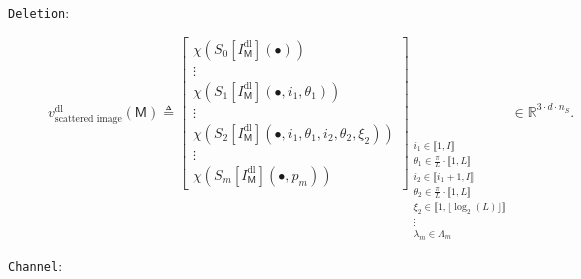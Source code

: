             \begin{description}
                \item[\texttt{Deletion}:]
                        \begin{equation}
                            \label{eq::deletion_scanetg_image_based_features}
                            v^{\text{dl}}_{\text{scattered image}}\left(\mathsf{M}\right) \triangleq \begin{bmatrix}
                                \chi \left(S_0[I^{\text{dl}}_{\mathsf{M}}]\left(\bullet\right)\right)\\
                                \vdots\\
                                \chi \left(S_1[I^{\text{dl}}_{\mathsf{M}}]\left(\bullet, i_1, \theta_1\right)\right)\\
                                \vdots\\
                                \chi \left(S_2[I^{\text{dl}}_{\mathsf{M}}]\left(\bullet, i_1, \theta_1, i_2, \theta_2, \xi_2\right)\right)\\
                                \vdots\\
                                \chi \left(S_m[I^{\text{dl}}_{\mathsf{M}}]\left(\bullet, p_m\right)\right)
                            \end{bmatrix}_{
                                \substack{
                                    i_1 \in \llbracket 1, I \rrbracket\\
                                    \theta_1 \in \frac{\pi}{L} \cdot \llbracket 1, L \rrbracket\\
                                    i_2 \in \llbracket i_1 + 1, I \rrbracket\\
                                    \theta_2 \in \frac{\pi}{L} \cdot \llbracket 1, L \rrbracket\\
                                    \xi_2 \in \llbracket 1, \lfloor\log_2(L)\rfloor \rrbracket\\
                                    \vdots\\
                                    \lambda_m \in \Lambda_m
                                }
                            } \in \mathbb{R}^{3 \cdot d \cdot n_S}.
                        \end{equation}
                \item[\texttt{Channel}:]
                        \begin{equation}
                            \label{eq::channel_scatnet_image_based_features}

\end{equation}
\end{description}
